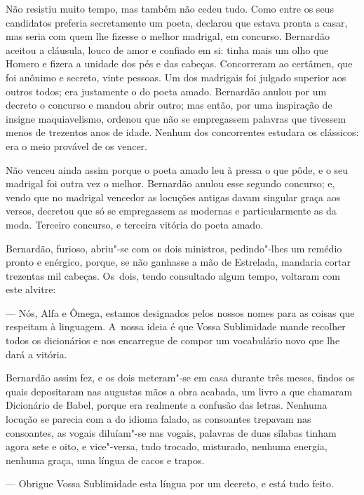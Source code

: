 \begin{linenumbers}
Não resistiu muito tempo, mas também não cedeu tudo. Como entre os seus
candidatos preferia secretamente um poeta, declarou que estava pronta a
casar, mas seria com quem lhe fizesse o melhor madrigal, em concurso.
Bernardão aceitou a cláusula, louco de amor e confiado em si: tinha mais
um olho que Homero e fizera a unidade dos pés e das cabeças. Concorreram
ao certâmen, que foi anônimo e secreto, vinte pessoas. Um dos madrigais
foi julgado superior aos outros todos; era justamente o do poeta amado.
Bernardão anulou por um decreto o concurso e mandou abrir outro; mas
então, por uma inspiração de insigne maquiavelismo, ordenou que não se
empregassem palavras que tivessem menos de trezentos anos de idade.
Nenhum dos concorrentes estudara os clássicos: era o meio provável de os
vencer.

Não venceu ainda assim porque o poeta amado leu à pressa o que pôde, e o
seu madrigal foi outra vez o melhor. Bernardão anulou esse segundo
concurso; e, vendo que no madrigal vencedor as locuções antigas davam
singular graça aos versos, decretou que só se empregassem as modernas e
particularmente as da moda. Terceiro concurso, e terceira vitória do
poeta amado.

Bernardão, furioso, abriu"-se com os dois ministros, pedindo"-lhes um
remédio pronto e enérgico, porque, se não ganhasse a mão de Estrelada,
mandaria cortar trezentas mil cabeças. Os~dois, tendo consultado algum
tempo, voltaram com este alvitre:

--- Nós, Alfa e Ômega, estamos designados pelos nossos nomes para as
coisas que respeitam à linguagem. A~nossa ideia é que Vossa Sublimidade
mande recolher todos os dicionários e nos encarregue de compor um
vocabulário novo que lhe dará a vitória.

Bernardão assim fez, e os dois meteram"-se em casa durante três meses,
findos os quais depositaram nas augustas mãos a obra acabada, um livro a
que chamaram Dicionário de Babel, porque era realmente a confusão das
letras. Nenhuma locução se parecia com a do idioma falado, as consoantes
trepavam nas consoantes, as vogais diluíam"-se nas vogais, palavras de
duas sílabas tinham agora sete e oito, e vice"-versa, tudo trocado,
misturado, nenhuma energia, nenhuma graça, uma língua de cacos e trapos.

--- Obrigue Vossa Sublimidade esta língua por um decreto, e está tudo
feito.


\end{linenumbers}
